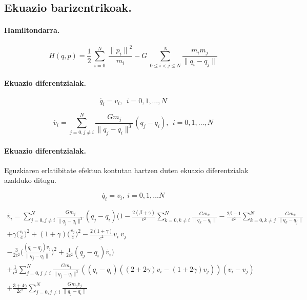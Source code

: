 \subsection{Ekuazio barizentrikoak.}

\paragraph*{Hamiltondarra.}

\begin{equation}
H(q,p)=\frac{1}{2}\ \sum^N_{i=0}{\ \frac{{\|p_i\|}^2}{m_i}}-G\ \sum^N_{0\le i<j\le N}{\frac{m_im_j}{\|q_i-q_j\|}} 
\end{equation}

\paragraph*{Ekuazio diferentzialak.}

\begin{equation}
\dot{q_i}=v_i, \ \  i=0,1,\dots, N
\end{equation}

\begin{equation}
\dot{v_i}= \sum_{j=0,j \neq i}^{N} \frac{Gm_j}{\|q_j-q_i\|^3} (q_j-q_i) , \ \  i=0,1,\dots, N
\end{equation}

\paragraph*{Ekuazio diferentzialak.}
Eguzkiaren erlatibitate efektua kontutan hartzen duten ekuazio diferentzialak azalduko ditugu.

\begin{equation}
\dot{q_i}=v_i, \  i=0,1,\dots N
\end{equation}

\begin{multline} 
\dot{v_i}= \sum_{j=0,j \neq i}^{N} \frac{Gm_j}{\|q_j-q_i\|^3} (q_j-q_i)
           \bigg(1- \frac{2(\beta+\gamma)}{c^2} \sum\limits_{k=0, k \neq i}^{N} \frac{Gm_k}{\|q_k-q_i\|} 
                  - \frac{2\beta-1}{c^2}        \sum\limits_{k=0, k \neq j}^{N} \frac{Gm_k}{\|q_k-q_j\|} \\
                  + \gamma \big(\frac{v_i}{c}\big)^2 + (1+\gamma) \big(\frac{v_j}{c} \big)^2 
                  - \frac{2(1+\gamma)}{c^2} v_i \ v_j \\
                  - \frac{3}{2c^2} \big(\frac{(q_i-q_j) v_j}{\|q_j-q_i\|} \big)^2+                  
                  \frac{1}{2c^2}(q_j-q_i) \dot{v_i} \bigg) \\
           + \frac{1}{c^2} \sum_{j=0,j \neq i}^{N} \frac{Gm_j}{\|q_j-q_i\|^3} 
             ((q_i-q_l) ((2+2\gamma)v_i-(1+2\gamma)v_j)) (v_i-v_j) \\
           + \frac{3+4\gamma}{2c^2} \sum_{j=0,j \neq i}^{N} \frac{Gm_j \dot{v_j}}{\|q_j-q_i\|}                                      
\end{multline}

